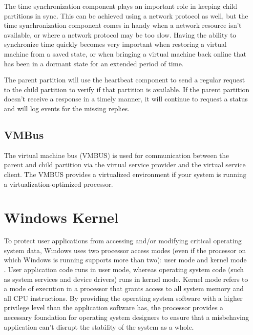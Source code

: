 \vspace{5mm}

The time synchronization component plays an important role in keeping child partitions in sync. This can be achieved using a network protocol as well, but the time synchronization component comes in handy when a network resource isn’t available, or where a network protocol may be too slow. Having the ability to synchronize time quickly becomes
very important when restoring a virtual machine from a saved state, or when bringing a virtual machine back online that has been in a dormant state for an extended period of time.

\vspace{5mm}

The parent partition will use the heartbeat component to send a regular request to the child partition to verify if that partition is available. If the parent partition doesn’t
receive a response in a timely manner, it will continue to request a status and will log
events for the missing replies.

\subsection{VMBus}

\vspace{5mm}

The virtual machine bus (VMBUS) \cite{BOOK:2} is used for communication between the parent and child partition via the virtual service provider and the virtual service client. The VMBUS
provides a virtualized environment if your system is running a virtualization-optimized processor.

\vspace{5mm}

\section{Windows Kernel}
\vspace{5mm}

To protect user applications from accessing and/or modifying critical operating system data, Windows
uses two processor access modes (even if the processor on which Windows is running supports more
than two): user mode and kernel mode \cite{BOOK:1} . User application code runs in user mode, whereas operating
system code (such as system services and device drivers) runs in kernel mode. Kernel mode refers to
a mode of execution in a processor that grants access to all system memory and all CPU instructions.
By providing the operating system software with a higher privilege level than the application software
has, the processor provides a necessary foundation for operating system designers to ensure that a
misbehaving application can’t disrupt the stability of the system as a whole.

